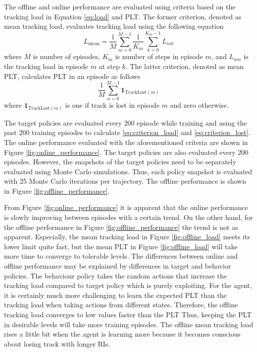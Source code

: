 \documentclass[english, 12pt, a4paper, elec, utf8, a-1b, online]{aaltothesis}
\renewcommand{\vec}[1]{\mathbf{#1}}
\begin{document}
The offline and online performance are evaluated using criteria based on the tracking load in Equation \eqref{eq:load} and PLT.
The former criterion, denoted as mean tracking load, evaluates tracking load using the following equation
\begin{equation}\label{eq:criterion_load}
    L_\text{mean} = \frac{1}{M} \sum_{m=0}^{M-1} \frac{1}{K_m}\sum_{k=0}^{K_m-1} L_{mk}
\end{equation}
where $M$ is number of episodes, $K_m$ is number of steps in episode $m$, and $L_{nm}$ is the tracking load in episode $m$ at step $k$.
The latter criterion, denoted as mean PLT, calculates PLT in an episode as follows
\begin{equation}\label{eq:criterion_lost}
    \frac{1}{M} \sum_{n=0}^{M-1} \vec{1}_{\text{TrackLost}(m)}
\end{equation}
where $\vec{1}_{\text{TrackLost}(m)}$ is one if track is lost in episode $m$ and zero otherwise.

The target policies are evaluated every 200 episode while training and using the past 200 training episodes to calculate \eqref{eq:criterion_load} and \eqref{eq:criterion_lost}.
The online performance evaluated with the aforementioned criteria are shown in Figure \ref{fig:online_performance}.
The target policies are also evaluated every 200 episodes. 
However, the snapshots of the target policies need to be separately evaluated using Monte Carlo simulations.
Thus, each policy snapshot is evaluated with 25 Monte Carlo iterations per trajectory.
The offline performance is shown in Figure \ref{fig:offline_performance}.

From Figure \ref{fig:online_performance} it is apparent that the online performance is slowly improving between episodes with a certain trend.
On the other hand, for the offline performance in Figure \ref{fig:offline_performance} the trend is not as apparent.
Especially, the mean tracking load in Figure \ref{fig:offline_load} meets its lower limit quite fast, but the mean PLT in Figure \ref{fig:offline_load} will take more time to converge to tolerable levels.
The differences between online and offline performance may be explained by differences in target and behavior policies.
The behaviour policy takes the random actions that increase the tracking load compared to target policy which is purely exploiting.
For the agent, it is certainly much more challenging to learn the expected PLT than the tracking load when taking actions from different states.
Therefore, the offline tracking load converges to low values faster than the PLT
Thus, keeping the PLT in desirable levels will take more training episodes.
The offline mean tracking load rises a little bit when the agent is learning more because it becomes conscious about losing track with longer RIs.
\end{document}
